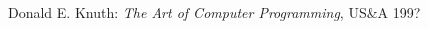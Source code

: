 \begin{thebibliography}{mmm}

 Donald E. Knuth: \emph{The Art of Computer Programming}, US\&A 199?
\end{thebibliography}
